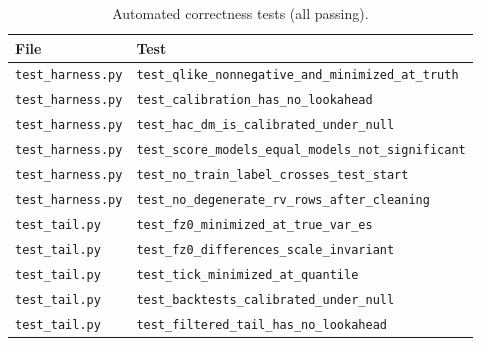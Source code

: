 \begin{table}[!htbp]
\centering
\small
\caption{Automated correctness tests (all passing).}
\label{tab:tests}
\begin{tabularx}{\linewidth}{lX}
\toprule
\textbf{File} & \textbf{Test} \\
\midrule
\texttt{test\_harness.py} & \texttt{test\_qlike\_nonnegative\_and\_minimized\_at\_truth} \\
\texttt{test\_harness.py} & \texttt{test\_calibration\_has\_no\_lookahead} \\
\texttt{test\_harness.py} & \texttt{test\_hac\_dm\_is\_calibrated\_under\_null} \\
\texttt{test\_harness.py} & \texttt{test\_score\_models\_equal\_models\_not\_significant} \\
\texttt{test\_harness.py} & \texttt{test\_no\_train\_label\_crosses\_test\_start} \\
\texttt{test\_harness.py} & \texttt{test\_no\_degenerate\_rv\_rows\_after\_cleaning} \\
\texttt{test\_tail.py} & \texttt{test\_fz0\_minimized\_at\_true\_var\_es} \\
\texttt{test\_tail.py} & \texttt{test\_fz0\_differences\_scale\_invariant} \\
\texttt{test\_tail.py} & \texttt{test\_tick\_minimized\_at\_quantile} \\
\texttt{test\_tail.py} & \texttt{test\_backtests\_calibrated\_under\_null} \\
\texttt{test\_tail.py} & \texttt{test\_filtered\_tail\_has\_no\_lookahead} \\
\bottomrule
\end{tabularx}
\end{table}

